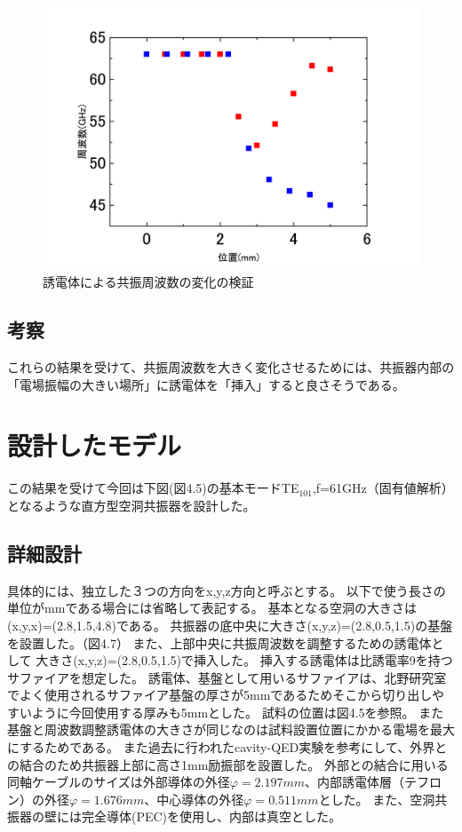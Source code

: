 \begin{figure}[h]
  \begin{center}
    \includegraphics[width=12cm]{./image/plot1.jpg}
    \caption{誘電体による共振周波数の変化の検証}
    \label{fig:Cavity}
  \end{center}
\end{figure}


\subsection{考察}
これらの結果を受けて、共振周波数を大きく変化させるためには、共振器内部の「電場振幅の大きい場所」に誘電体を「挿入」すると良さそうである。

\section{設計したモデル}
この結果を受けて今回は下図(図4.5)の基本モードTE$_{101}$,f=61GHz（固有値解析）となるような直方型空洞共振器を設計した。

\subsection{詳細設計}
具体的には、独立した３つの方向をx,y,z方向と呼ぶとする。
以下で使う長さの単位がmmである場合には省略して表記する。
基本となる空洞の大きさは(x,y,x)=(2.8,1.5,4.8)である。
共振器の底中央に大きさ(x,y,z)=(2.8,0.5,1.5)の基盤を設置した。（図4.7）
また、上部中央に共振周波数を調整するための誘電体として
大きさ(x,y,z)=(2.8,0.5,1.5)で挿入した。
挿入する誘電体は比誘電率9を持つサファイアを想定した。
誘電体、基盤として用いるサファイアは、北野研究室でよく使用されるサファイア基盤の厚さが5mmであるためそこから切り出しやすいように今回使用する厚みも5mmとした。
試料の位置は図4.5を参照。
また基盤と周波数調整誘電体の大きさが同じなのは試料設置位置にかかる電場を最大にするためである。
また過去に行われたcavity-QED実験\cite{cQED}を参考にして、外界との結合のため共振器上部に高さ1mm励振部を設置した。
外部との結合に用いる同軸ケーブルのサイズは外部導体の外径$φ=2.197mm$、内部誘電体層（テフロン）の外径$φ=1.676mm$、中心導体の外径$φ=0.511mm$とした。
また、空洞共振器の壁には完全導体(PEC)を使用し、内部は真空とした。

